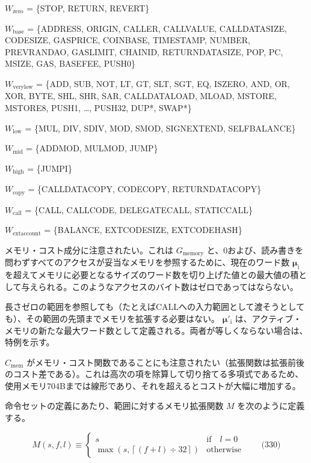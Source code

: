\documentclass[
]{ltjsarticle}
\begin{document}
\(W_{\mathrm{zero}}\) = \{STOP, RETURN, REVERT\}

\(W_{\mathrm{base}}\) = \{ADDRESS, ORIGIN, CALLER, CALLVALUE,
CALLDATASIZE, CODESIZE, GASPRICE, COINBASE, TIMESTAMP, NUMBER,
PREVRANDAO, GASLIMIT, CHAINID, RETURNDATASIZE, POP, PC, MSIZE, GAS,
BASEFEE, PUSH0\}

\(W_{\mathrm{verylow}}\) = \{ADD, SUB, NOT, LT, GT, SLT, SGT, EQ,
ISZERO, AND, OR, XOR, BYTE, SHL, SHR, SAR, CALLDATALOAD, MLOAD, MSTORE,
MSTORE8, PUSH1, \ldots, PUSH32, DUP*, SWAP*\}

\(W_{\mathrm{low}}\) = \{MUL, DIV, SDIV, MOD, SMOD, SIGNEXTEND,
SELFBALANCE\}

\(W_{\mathrm{mid}}\) = \{ADDMOD, MULMOD, JUMP\}

\(W_{\mathrm{high}}\) = \{JUMPI\}

\(W_{\mathrm{copy}}\) = \{CALLDATACOPY, CODECOPY, RETURNDATACOPY\}

\(W_{\mathrm{call}}\) = \{CALL, CALLCODE, DELEGATECALL, STATICCALL\}

\(W_{\mathrm{extaccount}}\) = \{BALANCE, EXTCODESIZE, EXTCODEHASH\}

メモリ・コスト成分に注意されたい。これは \(G_{\mathrm{memory}}\)
と、0および、読み書きを問わずすべてのアクセスが妥当なメモリを参照するために、現在のワード数
\(\boldsymbol{\mu}_{\mathrm{i}}\)
を超えてメモリに必要となるサイズのワード数を切り上げた値との最大値の積として与えられる。このようなアクセスのバイト数はゼロであってはならない。

長さゼロの範囲を参照しても（たとえばCALLへの入力範囲として渡そうとしても）、その範囲の先頭までメモリを拡張する必要はない。
\(\boldsymbol{\mu}'_{\mathrm{i}}\)
は、アクティブ・メモリの新たな最大ワード数として定義される。両者が等しくならない場合は、特例を示す。

\(C_{\mathrm{mem}}\)
がメモリ・コスト関数であることにも注意されたい（拡張関数は拡張前後のコスト差である）。これは高次の項を除算して切り捨てる多項式であるため、使用メモリ704Bまでは線形であり、それを超えるとコストが大幅に増加する。

命令セットの定義にあたり、範囲に対するメモリ拡張関数 \(M\)
を次のように定義する。

\protect\hypertarget{eq-330}{}{}

\[M(s, f, l) \equiv \begin{cases}
s & \text{if} \quad l = 0 \\
\max(s, \left\lceil  (f + l) \div 32  \right\rceil) & \text{otherwise}
\end{cases} \qquad \text{(330)}\]
\end{document}
